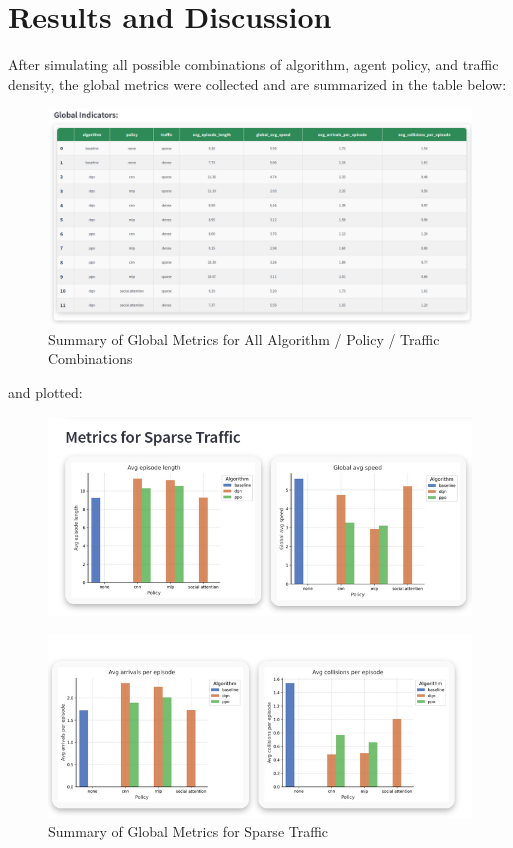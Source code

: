 \section{Results and Discussion}

After simulating all possible combinations of algorithm, agent policy, and traffic density, the global metrics were collected and are summarized in the table below:

\begin{figure}[H]
    \centering
    \includegraphics[height=0.38\textheight]{images/app_global_indicators.png} 
    \caption{Summary of Global Metrics for All Algorithm / Policy / Traffic Combinations}
\end{figure}

and plotted:

\begin{figure}[H]
    \centering
    \includegraphics[height=0.215\textheight]{images/app_global_plots_sparse1.png} 
\end{figure}

\begin{figure}[H]
    \centering
    \includegraphics[height=0.2\textheight]{images/app_global_plots_sparse2.png} 
    \caption{Summary of Global Metrics for Sparse Traffic}
\end{figure}

